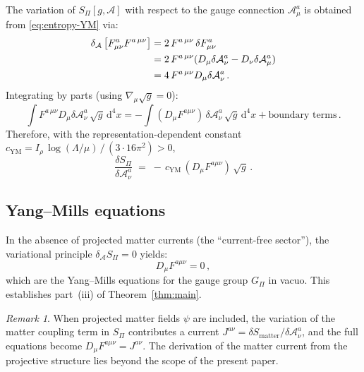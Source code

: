 \documentclass[12pt,a4paper]{article}
\theoremstyle{remark}
\newtheorem*{remark}{Remark}
\theoremstyle{plain}
\theoremstyle{definition}
\begin{document}
      The variation of $S_\Pi[g, \mathcal{A}]$ with respect to the
      gauge connection $\mathcal{A}^a_\mu$ is obtained from
      \eqref{eq:entropy-YM} via:
      \begin{align}\label{eq:vertical-variation}
        \delta_\mathcal{A}
        \left[F^a_{\mu\nu}F^{a\,\mu\nu}\right]
        &=
        2\,F^{a\,\mu\nu}\,\delta F^a_{\mu\nu}
        \notag\\
        &=
        2\,F^{a\,\mu\nu}
            (D_\mu \delta\mathcal{A}^a_\nu
            - D_\nu \delta\mathcal{A}^a_\mu)
        \notag\\
        &=
        4\,F^{a\,\mu\nu} D_\mu \delta\mathcal{A}^a_\nu\,.
      \end{align}
      Integrating by parts (using $\nabla_\mu\sqrt{g} = 0$):
      \begin{equation}\label{eq:integration-by-parts}
        \int F^{a\,\mu\nu} D_\mu \delta\mathcal{A}^a_\nu
        \,\sqrt{g}\,\mathrm{d}^4 x
        =
        -\int (D_\mu F^{a\mu\nu})\,\delta\mathcal{A}^a_\nu
        \,\sqrt{g}\,\mathrm{d}^4 x
        + \text{boundary terms}\,.
      \end{equation}
      Therefore, with the representation-dependent constant
      $c_{\mathrm{YM}}
      = I_\rho\,\log(\Lambda/\mu)\,/\,(3 \cdot 16\pi^2) > 0$,
      \begin{equation}\label{eq:variation-entropy}
        \frac{\delta S_\Pi}{\delta \mathcal{A}^a_\nu}
        \;=\;
        -\,c_{\mathrm{YM}}\,
        (D_\mu F^{a\mu\nu})\,\sqrt{g}\,.
      \end{equation}

    \subsection{Yang--Mills equations}
      \label{subsec:YM-equations}

      In the absence of projected matter currents
      (the ``current-free sector''), the variational
      principle $\delta_\mathcal{A} S_\Pi = 0$ yields:
      \begin{equation}\label{eq:YM-equations}
        \boxed{D_\mu F^{a\mu\nu} = 0\,,}
      \end{equation}
      which are the Yang--Mills equations for the gauge group $G_\Pi$
      in vacuo.
      This establishes part~(iii) of Theorem~\ref{thm:main}.

      \begin{remark}
        When projected matter fields $\psi$ are included,
        the variation of the matter coupling term in $S_\Pi$
        contributes a current $J^{a\nu} = \delta S_{\mathrm{matter}}
        / \delta \mathcal{A}^a_\nu$, and the full equations
        become $D_\mu F^{a\mu\nu} = J^{a\nu}$.
        The derivation of the matter current from the projective
        structure lies beyond the scope of the present paper.
      \end{remark}
\end{document}
